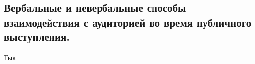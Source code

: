 \documentclass[a4paper,12pt]{article}
\begin{document}
\begin{large}

\setlength{\parindent}{20pt} 
\section{Вербальные и невербальные способы взаимодействия с аудиторией во время публичного выступления.}
Тык
\end{large}
\end{document}

